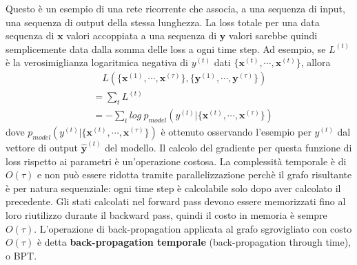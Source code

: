 \documentclass[12pt,a4paper]{report}
\begin{document}
    Questo \`e un esempio di una rete ricorrente che associa, a una
    sequenza di input, una sequenza di output della stessa lunghezza.
    La loss totale per una data sequenza di $\boldsymbol{x}$ valori
    accoppiata a una sequenza di $\boldsymbol{y}$ valori sarebbe quindi
    semplicemente data dalla somma delle loss a ogni time step. Ad
    esempio, se $L^{(t)}$ \`e la verosimiglianza logaritmica negativa
    di $y^{(t)}$ dati $\{\boldsymbol{x}^{(t)},\cdots,\boldsymbol{x}^{(t)}\}$,
    allora
    \begin{align}
        &\quad L\left(\{\boldsymbol{x}^{(1)},\cdots,
            \boldsymbol{x}^{(\tau)}\},
        \{\boldsymbol{y}^{(1)},\cdots,
            \boldsymbol{y}^{(\tau)}\}\right)\\
        &=\sum\limits_{t}L^{(t)}\\
        &=-\sum\limits_{t}log\ p_{model}\left(y^{(t)}|
        \{\boldsymbol{x}^{(t)},\cdots,\boldsymbol{x}^{(\tau)}\}\right)
    \end{align}
    dove $p_{model}\left(y^{(t)}|\{\boldsymbol{x}^{(t)},\cdots,
    \boldsymbol{x}^{(\tau)}\}\right)$ \`e ottenuto osservando l'esempio
    per $y^{(t)}$ dal vettore di output $\boldsymbol{\hat{y}}^{(t)}$ del
    modello. Il calcolo del gradiente per questa funzione di loss 
    rispetto ai parametri \`e un'operazione costosa. La complessit\`a
    temporale \`e di $O(\tau)$ e non pu\`o essere ridotta tramite
    parallelizzazione perch\`e il grafo risultante \`e per natura
    sequenziale: ogni time step \`e calcolabile solo dopo aver calcolato
    il precedente. Gli stati calcolati nel forward pass devono essere
    memorizzati fino al loro riutilizzo durante il backward pass, quindi
    il costo in memoria \`e sempre $O(\tau)$. L'operazione di 
    back-propagation applicata al grafo sgrovigliato con costo $O(\tau)$
    \`e detta \textbf{back-propagation temporale} (back-propagation 
    through time), o BPT. 
\end{document}
